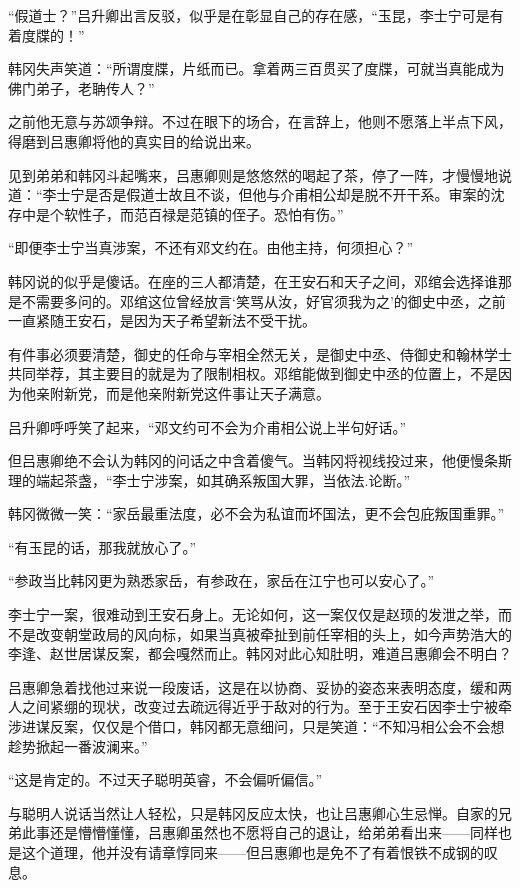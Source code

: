 “假道士？”吕升卿出言反驳，似乎是在彰显自己的存在感，“玉昆，李士宁可是有着度牒的！”

韩冈失声笑道：“所谓度牒，片纸而已。拿着两三百贯买了度牒，可就当真能成为佛门弟子，老聃传人？”

之前他无意与苏颂争辩。不过在眼下的场合，在言辞上，他则不愿落上半点下风，得磨到吕惠卿将他的真实目的给说出来。

见到弟弟和韩冈斗起嘴来，吕惠卿则是悠悠然的喝起了茶，停了一阵，才慢慢地说道：“李士宁是否是假道士故且不谈，但他与介甫相公却是脱不开干系。审案的沈存中是个软性子，而范百禄是范镇的侄子。恐怕有伤。”

“即便李士宁当真涉案，不还有邓文约在。由他主持，何须担心？”

韩冈说的似乎是傻话。在座的三人都清楚，在王安石和天子之间，邓绾会选择谁那是不需要多问的。邓绾这位曾经放言‘笑骂从汝，好官须我为之’的御史中丞，之前一直紧随王安石，是因为天子希望新法不受干扰。

有件事必须要清楚，御史的任命与宰相全然无关，是御史中丞、侍御史和翰林学士共同举荐，其主要目的就是为了限制相权。邓绾能做到御史中丞的位置上，不是因为他亲附新党，而是他亲附新党这件事让天子满意。

吕升卿呼呼笑了起来，“邓文约可不会为介甫相公说上半句好话。”

但吕惠卿绝不会认为韩冈的问话之中含着傻气。当韩冈将视线投过来，他便慢条斯理的端起茶盏，“李士宁涉案，如其确系叛国大罪，当依法.论断。”

韩冈微微一笑：“家岳最重法度，必不会为私谊而坏国法，更不会包庇叛国重罪。”

“有玉昆的话，那我就放心了。”

“参政当比韩冈更为熟悉家岳，有参政在，家岳在江宁也可以安心了。”

李士宁一案，很难动到王安石身上。无论如何，这一案仅仅是赵顼的发泄之举，而不是改变朝堂政局的风向标，如果当真被牵扯到前任宰相的头上，如今声势浩大的李逢、赵世居谋反案，都会嘎然而止。韩冈对此心知肚明，难道吕惠卿会不明白？

吕惠卿急着找他过来说一段废话，这是在以协商、妥协的姿态来表明态度，缓和两人之间紧绷的现状，改变过去疏远得近乎于敌对的行为。至于王安石因李士宁被牵涉进谋反案，仅仅是个借口，韩冈都无意细问，只是笑道：“不知冯相公会不会想趁势掀起一番波澜来。”

“这是肯定的。不过天子聪明英睿，不会偏听偏信。”

与聪明人说话当然让人轻松，只是韩冈反应太快，也让吕惠卿心生忌惮。自家的兄弟此事还是懵懵懂懂，吕惠卿虽然也不愿将自己的退让，给弟弟看出来——同样也是这个道理，他并没有请章惇同来——但吕惠卿也是免不了有着恨铁不成钢的叹息。


